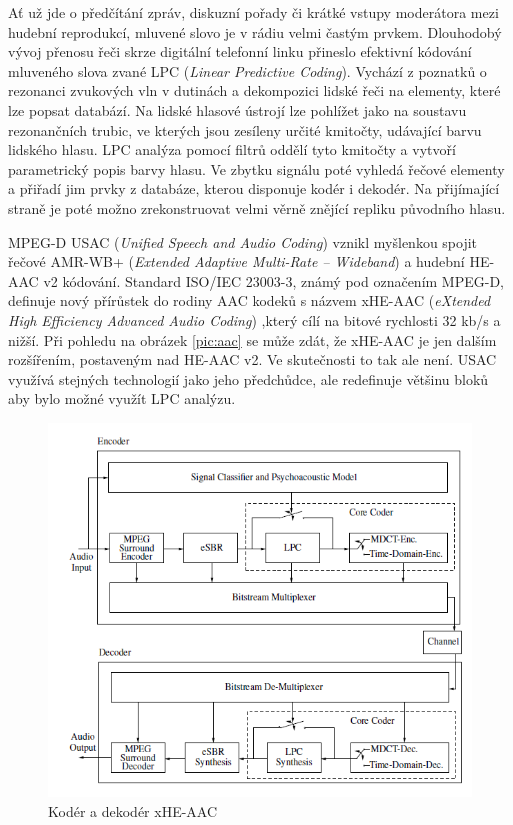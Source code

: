 Ať už jde o předčítání zpráv, diskuzní pořady či krátké vstupy moderátora mezi hudební reprodukcí, mluvené slovo je v rádiu velmi častým prvkem. Dlouhodobý vývoj přenosu řeči skrze digitální telefonní linku přineslo efektivní kódování mluveného slova zvané LPC (\textit{Linear Predictive Coding}). Vychází z poznatků o rezonanci zvukových vln v dutinách a dekompozici lidské řeči na elementy, které lze popsat databází. Na lidské hlasové ústrojí lze pohlížet jako na soustavu rezonančních trubic, ve kterých jsou zesíleny určité kmitočty, udávající barvu lidského hlasu. LPC analýza pomocí filtrů oddělí tyto kmitočty a vytvoří parametrický popis barvy hlasu. Ve zbytku signálu poté vyhledá řečové elementy a přiřadí jim prvky z databáze, kterou disponuje kodér i dekodér. Na přijímající straně je poté možno zrekonstruovat velmi věrně znějící repliku původního hlasu.

MPEG-D USAC (\textit{Unified Speech and Audio Coding}) vznikl myšlenkou spojit řečové AMR-WB+ (\textit{Extended Adaptive Multi-Rate – Wideband}) a hudební HE-AAC v2 kódování. Standard ISO/IEC 23003-3, známý pod označením MPEG-D, definuje nový přírůstek do rodiny AAC kodeků s názvem xHE-AAC (\textit{eXtended High Efficiency Advanced Audio Coding}) \cite{iso:usac},který cílí na bitové rychlosti 32 kb/s a nižší. Při pohledu na obrázek \ref{pic:aac} se může zdát, že xHE-AAC je jen dalším rozšířením, postaveným nad HE-AAC v2. Ve skutečnosti to tak ale není. USAC využívá stejných technologií jako jeho předchůdce, ale redefinuje většinu bloků aby bylo možné využít LPC analýzu. 

    \begin{figure}[h]
        \centering
        \includegraphics[width=.7\textwidth]{pic/usac.png}
        \caption{Kodér a dekodér xHE-AAC \cite{article:usac}}
        \label{pic:usac}
    \end{figure}
    
